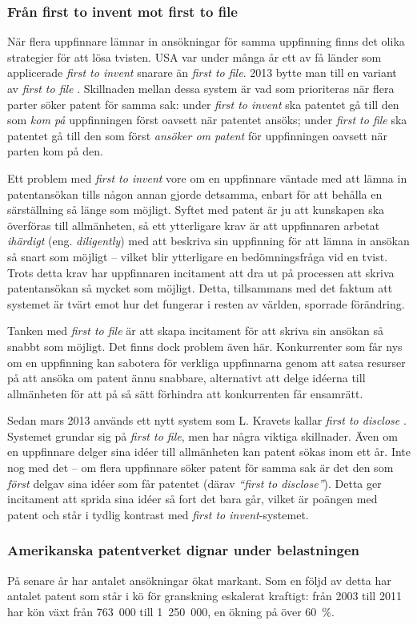 \subsubsection{Från first to invent mot first to file}
När flera uppfinnare lämnar in ansökningar för samma uppfinning finns det olika strategier för att lösa tvisten. USA var under många år ett av få länder som applicerade \emph{first to invent} snarare än \emph{first to file}. 2013 bytte man till en variant av \emph{first to file} \cite{kravets}. Skillnaden mellan dessa system är vad som prioriteras när flera parter söker patent för samma sak: under \emph{first to invent} ska patentet gå till den som \emph{kom på} uppfinningen först oavsett när patentet ansöks; under \emph{first to file} ska patentet gå till den som först \emph{ansöker om patent} för uppfinningen oavsett när parten kom på den.

Ett problem med \emph{first to invent} vore om en uppfinnare väntade med att lämna in patentansökan tills någon annan gjorde detsamma, enbart för att behålla en särställning så länge som möjligt. Syftet med patent är ju att kunskapen ska överföras till allmänheten, så ett ytterligare krav är att uppfinnaren arbetat \emph{ihärdigt} (eng. \emph{diligently}) med att beskriva sin uppfinning för att lämna in ansökan så snart som möjligt -- vilket blir ytterligare en bedömningsfråga vid en tvist. Trots detta krav har uppfinnaren incitament att dra ut på processen att skriva patentansökan så mycket som möjligt. Detta, tillsammans med det faktum att systemet är tvärt emot hur det fungerar i resten av världen, sporrade förändring.

Tanken med \emph{first to file} är att skapa incitament för att skriva sin ansökan så snabbt som möjligt. Det finns dock problem även här. Konkurrenter som får nys om en uppfinning kan sabotera för verkliga uppfinnarna genom att satsa resurser på att ansöka om patent ännu snabbare, alternativt att delge idéerna till allmänheten för att på så sätt förhindra att konkurrenten får ensamrätt.

Sedan mars 2013 används ett nytt system som L. Kravets kallar \emph{first to disclose} \cite{kravets}. Systemet grundar sig på \emph{first to file}, men har några viktiga skillnader. Även om en uppfinnare delger sina idéer till allmänheten kan patent sökas inom ett år. Inte nog med det -- om flera uppfinnare söker patent för samma sak är det den som \emph{först} delgav sina idéer som får patentet (därav \emph{``first to disclose''}). Detta ger incitament att sprida sina idéer så fort det bara går, vilket är poängen med patent och står i tydlig kontrast med \emph{first to invent}-systemet.

\subsubsection{Amerikanska patentverket dignar under belastningen}
På senare år har antalet ansökningar ökat markant. Som en följd av detta har antalet patent som står i kö för granskning eskalerat kraftigt: från 2003 till 2011 har kön växt från 763~000 till 1~250~000, en ökning på över 60~\%.
